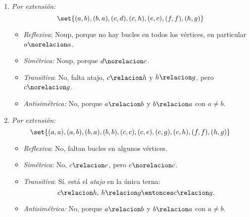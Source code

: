 \begin{enumerate}[label=\roman*)]

  \item
        \begin{minipage}{0.3\textwidth}
          \diecinuevei
        \end{minipage}
        \begin{minipage}{0.7\textwidth}
          \textit{Por extensión:}
          $$
            \set{(a,b),(b,a),(c,d),(c,h),(e,c),(f,f),(h,g)}
          $$
          \begin{itemize}
            \item \textit{Reflexiva}: Noup, porque no hay bucles en todos los vértices, en particular $a \norelacion a$.
            \item \textit{Simétrica:} Noup, porque $d \norelacion c$.
            \item \textit{Transitiva}: No, falta atajo, $c \relacion h$ y $h \relacion g$, pero $c \norelacion g$.
            \item \textit{Antisimétrica:} No, porque $a \relacion b$ y $b \relacion a$ con $a \neq b$.
          \end{itemize}
        \end{minipage}

        \bigskip

  \item
        \begin{minipage}{0.25\textwidth}
          \diecinueveii
        \end{minipage}
        \begin{minipage}{0.7\textwidth}
          \textit{Por extensión:}
          $$
            \set{(a,a),(a,b),(b,a),(b,b),(c,c),(c,e),(c,g),
              (c,h),(f,f),(h,g)}
          $$
          \begin{itemize}
            \item \textit{Reflexiva}: No, faltan bucles en algunos vértices.
            \item \textit{Simétrica}: No, $c \relacion e$, pero $e \norelacion c$.
            \item \textit{Transitiva}: Sí. está el \textit{atajo} en la única terna:
                  $$
                    c \relacion h,\, h \relacion g \entonces c \relacion g.
                  $$
            \item \textit{Antisimétrica:} No, porque $a \relacion b$ y $b \relacion a$ con $a \neq b$.
          \end{itemize}
        \end{minipage}


\end{enumerate}
